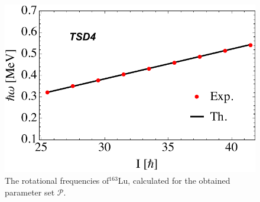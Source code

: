 \documentclass[myclassdoc,debug]{rjparticle}
\begin{document}
\begin{figure}
\begin{minipage}{.5\textwidth}
 \includegraphics[scale=0.44]{sub-paper1/figs/hrot_tsd4.pdf}
\end{minipage}
\caption{The rotational frequencies of$^{163}$Lu, calculated for the obtained parameter set $\mathcal{P}$.}
    \label{hrot_plots}
\end{figure}
\end{document}
